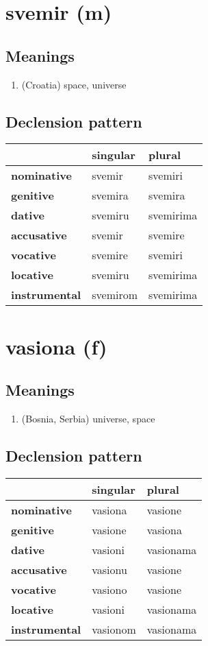 \filbreak
\section{svemir (m)}
\subsection*{Meanings}
\begin{enumerate}
\item (Croatia) space, universe
\end{enumerate}
\subsection*{Declension pattern}
\begin{tabularx}{\linewidth}{Xll}
\toprule
{} &  singular &     plural \\
\midrule
\textbf{nominative  } &    svemir &    svemiri \\
\textbf{genitive    } &   svemira &    svemira \\
\textbf{dative      } &   svemiru &  svemirima \\
\textbf{accusative  } &    svemir &    svemire \\
\textbf{vocative    } &   svemire &    svemiri \\
\textbf{locative    } &   svemiru &  svemirima \\
\textbf{instrumental} &  svemirom &  svemirima \\
\bottomrule
\end{tabularx}

\filbreak
\section{vasiona (f)}
\subsection*{Meanings}
\begin{enumerate}
\item (Bosnia, Serbia) universe, space
\end{enumerate}
\subsection*{Declension pattern}
\begin{tabularx}{\linewidth}{Xll}
\toprule
{} &  singular &     plural \\
\midrule
\textbf{nominative  } &   vasiona &    vasione \\
\textbf{genitive    } &   vasione &    vasiona \\
\textbf{dative      } &   vasioni &  vasionama \\
\textbf{accusative  } &   vasionu &    vasione \\
\textbf{vocative    } &   vasiono &    vasione \\
\textbf{locative    } &   vasioni &  vasionama \\
\textbf{instrumental} &  vasionom &  vasionama \\
\bottomrule
\end{tabularx}

